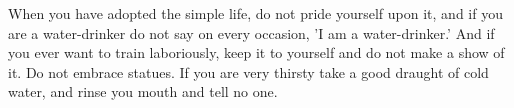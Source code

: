 When you have  adopted the simple life,  do not pride yourself upon  it, and if
you are a water-drinker  do not say on every occasion,  'I am a water-drinker.'
And if you ever want to train laboriously,  keep it to yourself and do not make
a show  of it.  Do not embrace  statues. If  you are very  thirsty take  a good
draught of cold water, and rinse you mouth and tell no one.
